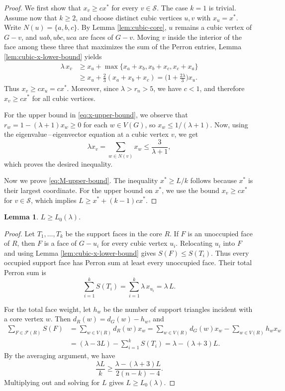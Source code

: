 \documentclass[11pt]{article}
\theoremstyle{plain}
\newtheorem{lemma}{Lemma}[section]
\theoremstyle{definition}
\numberwithin{equation}{section}
\begin{document}
\begin{proof}
We first show that $x_v\geq cx^*$ for every $v\in\mathcal{S}$. The case $k = 1$ is trivial. 
Assume now that $k\geq 2$, and choose distinct cubic vertices $u,v$ with $x_u=x^*$. 
Write $N(u) = \{a,b,c\}$. By Lemma \ref{lem:cubic-core}, $u$ remains a cubic vertex of $G-v$, and
$uab,ubc,uca$ are faces of $G-v$. Moving $v$ inside the interior of the face among these 
three that maximizes the sum of the Perron entries, Lemma \ref{lem:cubic-x-lower-bound} yields
\begin{align*}
\lambda\, x_v
& \geq x_u + \max\{x_a + x_b, x_b + x_c, x_c + x_a\} \\
& \geq x_u + \frac{2}{3} (x_a + x_b + x_c)
= \Big(1 + \frac{2\lambda}{3}\Big) x_u.
\end{align*}
Thus $x_v\geq cx_u = cx^*$. Moreover, since $\lambda > r_n > 5$, we have $c < 1$, and 
therefore $x_v\geq cx^*$ for all cubic vertices. 

For the upper bound in \eqref{eq:x-upper-bound}, we observe that $r_w = 1 - (\lambda + 1) x_w \geq 0$ 
for each $w\in V(G)$, so $x_w\leq 1/(\lambda + 1)$. Now, using
the eigenvalue\,--\,eigenvector equation at a cubic vertex $v$, we get
\[
\lambda x_v = \sum_{w\in N(v)} x_w\leq\frac{3}{\lambda + 1},
\]
which proves the desired inequality.

Now we prove \eqref{eq:M-upper-bound}. The inequality $x^*\geq L/k$ follows because $x^*$ is their largest
coordinate. For the upper bound on $x^*$, we use the bound $x_v\geq cx^*$ for $v\in\mathcal{S}$, 
which implies $L\geq x^* + (k-1)cx^*$. 
\end{proof}

\begin{lemma}\label{lem:L-L0}
$L\geq L_0(\lambda)$.
\end{lemma}

\begin{proof}
Let $T_1,\ldots,T_k$ be the support faces in the core $R$. If $F$ is
an unoccupied face of $R$, then $F$ is a face of $G-u_i$ for every
cubic vertex $u_i$. Relocating $u_i$ into $F$ and using Lemma \ref{lem:cubic-x-lower-bound} gives
$S(F)\leq S(T_i)$.
Thus every occupied support face has Perron sum at least every unoccupied
face. Their total Perron sum is
\[
\sum_{i=1}^k S(T_i) = \sum_{i=1}^k \lambda\, x_{u_i} = \lambda\, L.
\]

For the total face weight, let $h_w$ be the number of support triangles
incident with a core vertex $w$. Then $d_R(w)=d_G(w)-h_w$, and
\begin{align*}
\sum_{F\in\mathcal{F}(R)} S(F)
& = \sum_{w\in V(R)} d_R(w) x_w
= \sum_{w\in V(R)} d_G(w)x_w - \sum_{w\in V(R)} h_wx_w \\
& = (\lambda - 3L) - \sum_{i=1}^k S(T_i) = \lambda - (\lambda + 3) L.
\end{align*}
By the averaging argument, we have
\[
\frac{\lambda L}{k} \geq \frac{\lambda - (\lambda + 3) L}{2(n - k) - 4}.
\]
Multiplying out and solving for $L$ gives $L\geq L_0(\lambda)$.
\end{proof}
\end{document}
